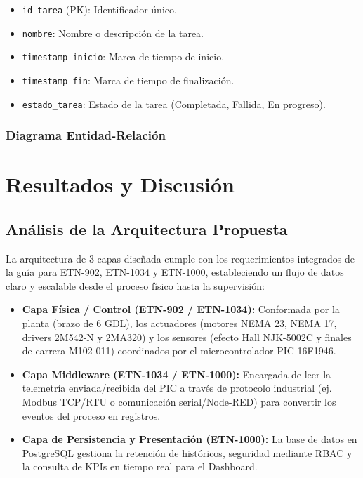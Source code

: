 \documentclass[11pt]{article}
\begin{document}
\begin{itemize}
	\item \texttt{id\_tarea} (PK): Identificador único.
	\item \texttt{nombre}: Nombre o descripción de la tarea.
	\item \texttt{timestamp\_inicio}: Marca de tiempo de inicio.
	\item \texttt{timestamp\_fin}: Marca de tiempo de finalización.
	\item \texttt{estado\_tarea}: Estado de la tarea (Completada, Fallida, En progreso).
\end{itemize}

\subsubsection{Diagrama Entidad-Relación}


\section{Resultados y Discusión}

\subsection{Análisis de la Arquitectura Propuesta}

La arquitectura de 3 capas diseñada cumple con los requerimientos integrados de la guía para ETN-902, ETN-1034 y ETN-1000, estableciendo un flujo de datos claro y escalable desde el proceso físico hasta la supervisión:

\begin{itemize}
	\item \textbf{Capa Física / Control (ETN-902 / ETN-1034):} Conformada por la planta (brazo de 6 GDL), los actuadores (motores NEMA 23, NEMA 17, drivers 2M542-N y 2MA320) y los sensores (efecto Hall NJK-5002C y finales de carrera M102-011) coordinados por el microcontrolador PIC 16F1946.
	\item \textbf{Capa Middleware (ETN-1034 / ETN-1000):} Encargada de leer la telemetría enviada/recibida del PIC a través de protocolo industrial (ej. Modbus TCP/RTU o comunicación serial/Node-RED) para convertir los eventos del proceso en registros.
	\item \textbf{Capa de Persistencia y Presentación (ETN-1000):} La base de datos en PostgreSQL gestiona la retención de históricos, seguridad mediante RBAC y la consulta de KPIs en tiempo real para el Dashboard.
\end{itemize}
\end{document}
